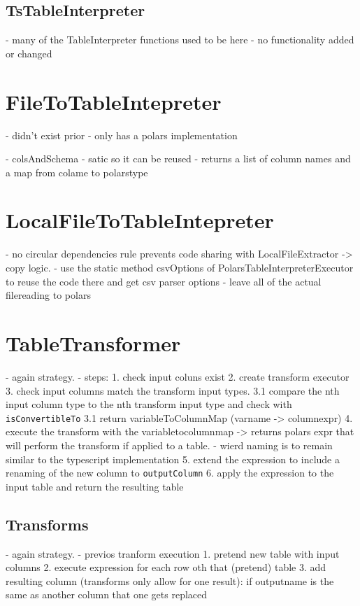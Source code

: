 \subsection{TsTableInterpreter}
- many of the TableInterpreter functions used to be here
- no functionality added or changed

\section{FileToTableIntepreter}
- didn't exist prior
- only has a polars implementation

- colsAndSchema
- satic so it can be reused
- returns a list of column names and a map from colame to polarstype

\section{LocalFileToTableIntepreter}
- no circular dependencies rule prevents code sharing with LocalFileExtractor -> copy logic.
- use the static method csvOptions of PolarsTableInterpreterExecutor to reuse the code there and get csv parser options
- leave all of the actual filereading to polars


\section{TableTransformer}
- again strategy.
- steps:
1. check input coluns exist
2. create transform executor
3. check input columns match the transform input types.
3.1 compare the nth input column type to the nth transform input type and check with \Verb|isConvertibleTo|
3.1 return variableToColumnMap (varname -> columnexpr)
4. execute the transform with the variabletocolumnmap -> returns polars expr that will perform the transform if applied to a table.
- wierd naming is to remain similar to the typescript implementation
5. extend the expression to include a renaming of the new column to \Verb|outputColumn|
6. apply the expression to the input table and return the resulting table

\subsection{Transforms}
- again strategy.
- previos tranform execution
1. pretend new table with input columns
2. execute expression for each row oth that (pretend) table
3. add resulting column (transforms only allow for one result): if outputname is the same as another column that one gets replaced

